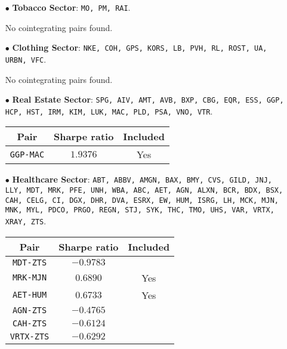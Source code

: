 \documentclass{paper}
\begin{document}
\begin{itemize}
\item[$\bullet$] \textbf{Tobacco Sector}: \texttt{MO, PM, RAI}.

No cointegrating pairs found.


\item[$\bullet$] \textbf{Clothing Sector}: \texttt{NKE, COH, GPS, KORS, LB, PVH, RL, ROST, UA, URBN, VFC}.

No cointegrating pairs found.


\item[$\bullet$] \textbf{Real Estate Sector}: \texttt{SPG, AIV, AMT, AVB, BXP, CBG, EQR, ESS, GGP, HCP, HST, IRM, KIM, LUK, MAC, PLD, PSA, VNO, VTR}.
\begin{center}
\begin{tabular}{| c | c | c | }
\hline
\textbf{Pair} & \textbf{Sharpe ratio}  & \textbf{Included} \\ \hline
\texttt{GGP-MAC} & $1.9376$ & Yes  \\ \hline
\end{tabular}
\end{center}


\item[$\bullet$] \textbf{Healthcare Sector}: \texttt{ABT, ABBV, AMGN, BAX, BMY, CVS, GILD, JNJ, LLY, MDT, MRK, PFE, UNH, WBA, ABC, AET, AGN, ALXN, BCR, BDX, BSX, CAH, CELG, CI, DGX, DHR, DVA, ESRX, EW, HUM, ISRG, LH, MCK, MJN, MNK, MYL, PDCO, PRGO, REGN, STJ, SYK, THC, TMO, UHS, VAR, VRTX, XRAY, ZTS}.
\begin{center}
\begin{tabular}{| c | c | c | }
\hline
\textbf{Pair} & \textbf{Sharpe ratio}  & \textbf{Included} \\ \hline
\texttt{MDT-ZTS} & $-0.9783$ &   \\ \hline
\texttt{MRK-MJN} & $0.6890$ &  Yes \\ \hline
\texttt{AET-HUM} & $0.6733$ &  Yes \\ \hline
\texttt{AGN-ZTS} & $-0.4765$ &   \\ \hline
\texttt{CAH-ZTS} & $-0.6124$ &   \\ \hline
\texttt{VRTX-ZTS} & $-0.6292$ &   \\ \hline
\end{tabular}
\end{center}



\end{itemize}
\end{document}
